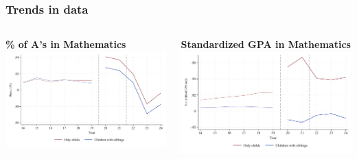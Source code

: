 \documentclass{beamer}
\begin{document}
\begin{frame}
    \label{frame:trends}
    \frametitle{Trends in data}
    \begin{columns}[T]
        \begin{column}{0.48\textwidth}
            \centering
            \textbf{\% of A's in Mathematics}
            \vspace{0.2cm}
            \includegraphics[width=\textwidth]{./FIGURES/Descriptive/raw_total_elm_pass_math_siblings.pdf}
        \end{column}
        \begin{column}{0.48\textwidth}
            \centering
            \textbf{Standardized GPA in Mathematics}
            \vspace{0.2cm}
            \includegraphics[width=\textwidth]{./FIGURES/Descriptive/raw_total_elm_std_gpa_m_adj_siblings.pdf}
        \end{column}
    \end{columns}
    
    
\end{frame}
\end{document}
